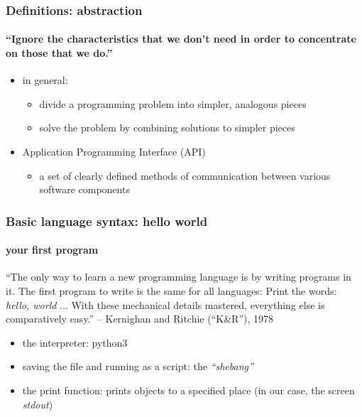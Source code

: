 \documentclass{beamer}
\begin{document}
    \begin{frame}
	    \frametitle{Definitions: abstraction}
	    \framesubtitle{``Ignore the characteristics that we don't need in order to concentrate on those that we do.''}
	    \begin{itemize}
		    \item in general:
			    \begin{itemize}
				    \item divide a programming problem into simpler, analogous pieces
				    \item solve the problem by combining solutions to simpler pieces
			    \end{itemize}
	    \end{itemize}
	    \begin{itemize}
		    \item Application Programming Interface (API)
			    \begin{itemize}
				    \item a set of clearly defined methods of communication between various software components
			    \end{itemize}
	    \end{itemize}
	    \lstA
    \end{frame}


    \begin{frame}
	    \frametitle{Basic language syntax: hello world}
	    \framesubtitle{your first program}
	    {\scriptsize
	    ``The only way to learn a new programming language is by writing programs in it. The first program to write is the same for all languages:
	    Print the words: \textit{hello, world}
	    ...  With these mechanical details mastered, everything else is comparatively easy.''
	    \newline
	    -- Kernighan and Ritchie (``K\&R''), 1978
	    }

	    \begin{itemize}
		    \item the interpreter: python3
		    \item saving the file and running as a script: the \textit{``shebang''}
		    \item the print function: prints objects to a specified place (in our case, the screen \textit{stdout})
	    \end{itemize}
	    \lstB
    \end{frame}
\end{document}
